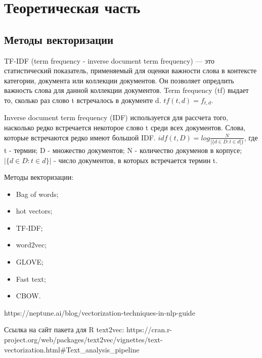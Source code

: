 \documentclass[bachelor, och, coursework ]{SCWorks}
\begin{document}
\tableofcontents







\intro



\section{ Теоретическая часть}
\subsection{ Методы векторизации}
TF-IDF (term frequency - inverse document term frequency) --- это статистический показатель, применяемый для оценки важности слова в контексте категории, документа или коллекции документов. Он позволяет опредлить важность слова для данной коллекции документов. 
Term frequency (tf) выдает то, сколько раз слово t встречалось в документе d.
$tf(t, d) = f_{t, d}$.

Inverse document term frequency (IDF) используется для рассчета того, насколько редко встречается некоторое слово t среди всех документов. Слова, которые встречаются редко имеют большой IDF.
$idf(t, D) = log\frac{N}{|\{d\in D:t\in d|\}}$, где t - термин; D - множество документов; N - количество докуменов в корпусе; $|\{d\in D:t\in d\}|$ - число документов, в которых встречается термин t.


Методы векторизации:
{\begin{itemize}
    \item Bag of words;
    \item hot vectors;
    \item TF-IDF;
    \item word2vec;
    \item GLOVE;
    \item Fast text;
    \item CBOW.
\end{itemize}}
https://neptune.ai/blog/vectorization-techniques-in-nlp-guide


Ссылка на сайт пакета для R text2vec: https://cran.r-project.org/web/packages/text2vec/vignettes/text-vectorization.html#Text\_analysis\_pipeline
\end{document}
